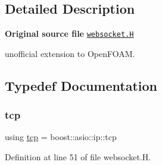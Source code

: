 \subsection{Detailed Description}
{\bfseries Original source file} \href{../../../home/carlo/data/GeN-Foam/GeN-Foam_ffn/GeN-Foam/GeN-Foam/FMU4FOAM/ECI4FOAM/src/externalComm/networkInterface/websocket.H}{\tt websocket.\+H}

\begin{DoxyVerb}unofficial extension to OpenFOAM.\end{DoxyVerb}


\subsection{Typedef Documentation}
\mbox{\label{websocket_8H_aacd32e7300ba1ea408f0cb79dbe33d86}} 
\subsubsection{\texorpdfstring{tcp}{tcp}}
{\footnotesize\ttfamily using \hyperlink{socket_8H_aacd32e7300ba1ea408f0cb79dbe33d86}{tcp} =  boost\+::asio\+::ip\+::tcp}



Definition at line 51 of file websocket.\+H.

